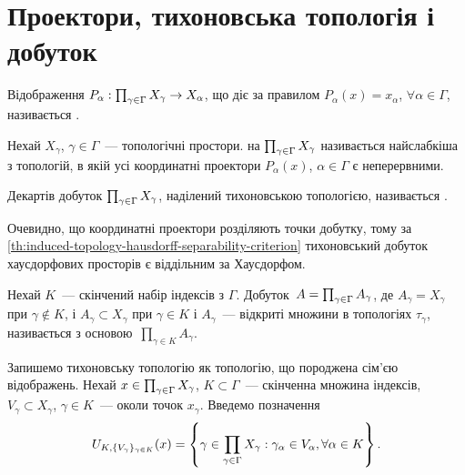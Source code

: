 \section{Проектори, тихоновська топологія і добуток}

\begin{definition}
    Відображення $P_\alpha: \prod_{\gamma\in\Gamma}{X}_\gamma \to X_\alpha$, що діє за правилом $P_\alpha (x) = x_\alpha$, $\forall \alpha \in \Gamma$, називається .
\end{definition}

\begin{definition}
    Нехай $X_\gamma$, $\gamma \in \Gamma$~--- топологічні простори.  на $\prod_{\gamma\in\Gamma}{X}_\gamma$ називається найслабкіша з топологій, в якій усі координатні проектори $P_\alpha (x)$, $\alpha \in \Gamma$ є неперервними.
\end{definition}

\begin{definition}
    Декартів добуток $\prod_{\gamma\in\Gamma}{X}_\gamma$, наділений тихоновською топологією, називається .
\end{definition}

\begin{remark}
    Очевидно, що координатні проектори розділяють точки добутку, тому за \cref{th:induced-topology-hausdorff-separability-criterion} тихоновський добуток хаусдорфових просторів є віддільним за Хаусдорфом.
\end{remark}

\begin{definition}
    Нехай $K$~--- скінчений набір індексів з $\Gamma$. Добуток~$A = \prod_{\gamma\in\Gamma}{A}_\gamma$, де $A_\gamma =  X_\gamma$ при $\gamma \notin K$, і $A_\gamma \subset X_\gamma$ при $\gamma \in K$ і $A_\gamma$~--- відкриті множини в топологіях $\tau_\gamma$, називається  з основою~$\prod_{\gamma \in K} A_\gamma$.
\end{definition}

Запишемо тихоновську топологію як топологію, що породжена сім'єю відображень. Нехай $x \in \prod_{\gamma\in\Gamma}{X}_\gamma$, $K \subset \Gamma$~--- скінченна множина індексів, $V_\gamma \subset X_\gamma$, $\gamma \in K$~--- околи точок $x_\gamma$. Введемо позначення
\begin{equation*}
    U_{K,\{V_\gamma\}_{\gamma\in K}}(x) =
    \left\{ \gamma \in \prod_{\gamma\in\Gamma}{X}_\gamma: \gamma_\alpha \in V_\alpha, \forall \alpha \in K \right\}.
\end{equation*}

